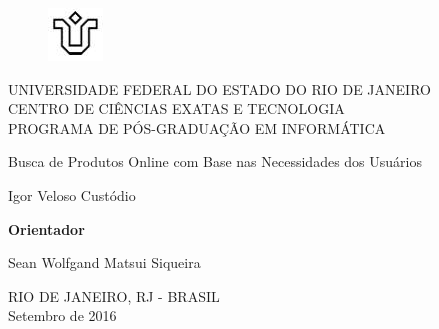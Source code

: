 \begin{figure}[!h]
    \centering
    \includegraphics[scale=1.0]{imagens/unirio.png}
\end{figure}

\begin{center}
    UNIVERSIDADE FEDERAL DO ESTADO DO RIO DE JANEIRO \\ 
    CENTRO DE CIÊNCIAS EXATAS E TECNOLOGIA \\ 
    PROGRAMA DE PÓS-GRADUAÇÃO EM INFORMÁTICA
    \vskip 7.0cm

    Busca de Produtos Online com Base nas Necessidades dos Usuários
    
    
    \vskip 1.0cm

    Igor Veloso Custódio
    
    \vskip 2.0cm
    
\end{center}

\begin{flushright}
    \textbf{Orientador}

    Sean Wolfgand Matsui Siqueira
    
\end{flushright}


\begin{center}
    RIO DE JANEIRO, RJ - BRASIL \\ 
    Setembro de 2016
\end{center}
